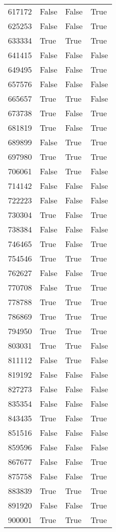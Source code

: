 \begin{tabular}{llll}
617172 &   False &   False &    True \\
625253 &   False &   False &    True \\
633334 &    True &    True &    True \\
641415 &   False &   False &   False \\
649495 &   False &   False &    True \\
657576 &   False &   False &   False \\
665657 &    True &    True &   False \\
673738 &    True &   False &    True \\
681819 &    True &   False &    True \\
689899 &   False &    True &    True \\
697980 &    True &    True &    True \\
706061 &   False &    True &   False \\
714142 &   False &   False &   False \\
722223 &   False &   False &   False \\
730304 &    True &   False &    True \\
738384 &   False &   False &   False \\
746465 &    True &   False &    True \\
754546 &    True &    True &    True \\
762627 &   False &   False &    True \\
770708 &   False &    True &    True \\
778788 &    True &    True &    True \\
786869 &    True &    True &    True \\
794950 &    True &    True &    True \\
803031 &    True &    True &   False \\
811112 &   False &    True &   False \\
819192 &   False &   False &   False \\
827273 &   False &   False &   False \\
835354 &   False &   False &   False \\
843435 &    True &   False &    True \\
851516 &   False &   False &   False \\
859596 &   False &   False &   False \\
867677 &   False &   False &    True \\
875758 &   False &   False &    True \\
883839 &    True &    True &    True \\
891920 &   False &   False &    True \\
900001 &    True &    True &    True \\
\bottomrule
\end{tabular}
